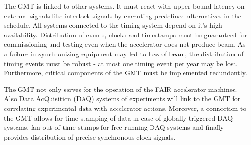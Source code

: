 The GMT  is linked to other  systems.  It must react  with upper bound
latency  on  external  signals  like interlock  signals  by  executing
predefined alternatives in the  schedule. All systems connected to the
timing  system  depend on  it's  high  availability.  Distribution  of
events, clocks and timestamps  must be guaranteed for commissioning and
testing even when the accelerator  does not produce beam. As a failure
in synchronizing equipment  may led to loss of  beam, the distribution
of timing  events must be robust -  at most one timing  event per year
may  be lost.  Furthermore, critical  components  of the  GMT must  be
implemented redundantly.

The  GMT not only  serves for  the operation  of the  FAIR accelerator
machines. Also Data AcQuisition (DAQ) systems of experiments will link
to  the  GMT  for   correlating  experimental  data  with  accelerator
actions. Moreover, a connection to the GMT allows for time stamping of
data in case of globally triggered DAQ systems, fan-out of time stamps
for  free running  DAQ systems  and finally  provides  distribution of
precise synchronous clock signals.

